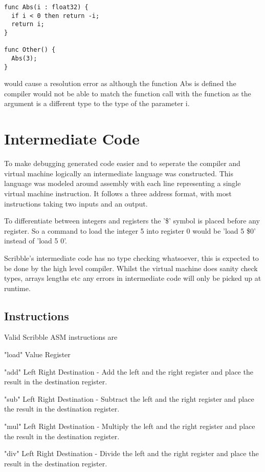 \documentclass[]{final_report}
\begin{document}
\begin{verbatim}
func Abs(i : float32) {
  if i < 0 then return -i;
  return i;
}

func Other() {
  Abs(3);
}
\end{verbatim}

would cause a resolution error as although the function Abs is defined the compiler would not be able to match the function call with the function as the argument is a different type to the type of the parameter i.

\chapter{Intermediate Code}

To make debugging generated code easier and to seperate the compiler and virtual machine logically an intermediate language was constructed. This language was modeled around assembly with each line representing a single virtual machine instruction. It follows a three address format, with most instructions taking two inputs and an output.

To differentiate between integers and registers the '\$' symbol is placed before any register. So a command to load the integer 5 into register 0 would be 'load 5 \$0' instead of 'load 5 0'.

Scribble's intermediate code has no type checking whatsoever, this is expected to be done by the high level compiler. Whilst the virtual machine does sanity check types, arrays lengths etc any errors in intermediate code will only be picked up at runtime.

\section{Instructions}

Valid Scribble ASM instructions are

"load" Value Register

"add" Left Right Destination - Add the left and the right register and place the result in the destination register.

"sub" Left Right Destination - Subtract the left and the right register and place the result in the destination register.

"mul" Left Right Destination - Multiply the left and the right register and place the result in the destination register.

"div" Left Right Destination - Divide the left and the right register and place the result in the destination register.
\end{document}
